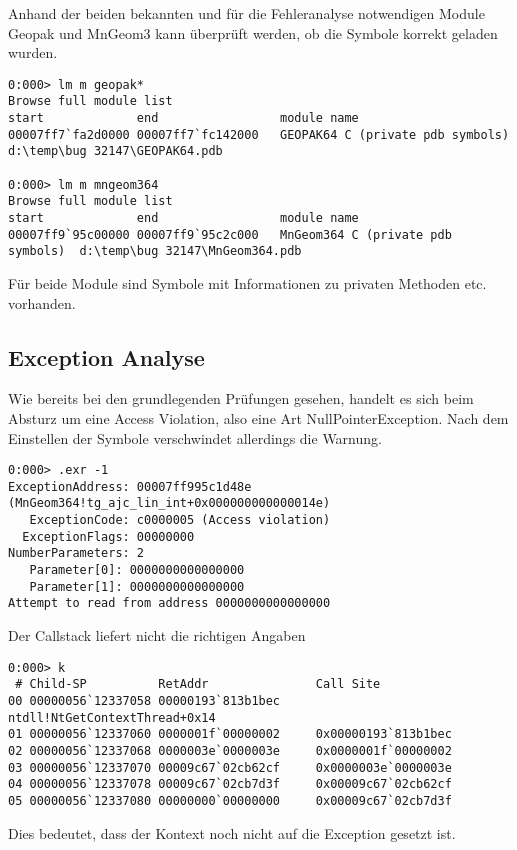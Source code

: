 Anhand der beiden bekannten und für die Fehleranalyse notwendigen Module Geopak und MnGeom3 kann überprüft werden, ob die Symbole korrekt geladen wurden.

\begin{lstlisting}
0:000> lm m geopak*
Browse full module list
start             end                 module name
00007ff7`fa2d0000 00007ff7`fc142000   GEOPAK64 C (private pdb symbols)  d:\temp\bug 32147\GEOPAK64.pdb

0:000> lm m mngeom364
Browse full module list
start             end                 module name
00007ff9`95c00000 00007ff9`95c2c000   MnGeom364 C (private pdb symbols)  d:\temp\bug 32147\MnGeom364.pdb
\end{lstlisting}

Für beide Module sind Symbole mit Informationen zu privaten Methoden etc. vorhanden.

\subsection{Exception Analyse}

Wie bereits bei den grundlegenden Prüfungen gesehen, handelt es sich beim Absturz um eine Access Violation, also eine Art NullPointerException. Nach dem Einstellen der Symbole verschwindet allerdings die Warnung.

\begin{lstlisting}
0:000> .exr -1
ExceptionAddress: 00007ff995c1d48e (MnGeom364!tg_ajc_lin_int+0x000000000000014e)
   ExceptionCode: c0000005 (Access violation)
  ExceptionFlags: 00000000
NumberParameters: 2
   Parameter[0]: 0000000000000000
   Parameter[1]: 0000000000000000
Attempt to read from address 0000000000000000
\end{lstlisting}

Der Callstack liefert nicht die richtigen Angaben

\begin{lstlisting}
0:000> k
 # Child-SP          RetAddr               Call Site
00 00000056`12337058 00000193`813b1bec     ntdll!NtGetContextThread+0x14
01 00000056`12337060 0000001f`00000002     0x00000193`813b1bec
02 00000056`12337068 0000003e`0000003e     0x0000001f`00000002
03 00000056`12337070 00009c67`02cb62cf     0x0000003e`0000003e
04 00000056`12337078 00009c67`02cb7d3f     0x00009c67`02cb62cf
05 00000056`12337080 00000000`00000000     0x00009c67`02cb7d3f
\end{lstlisting}

Dies bedeutet, dass der Kontext noch nicht auf die Exception gesetzt ist.

